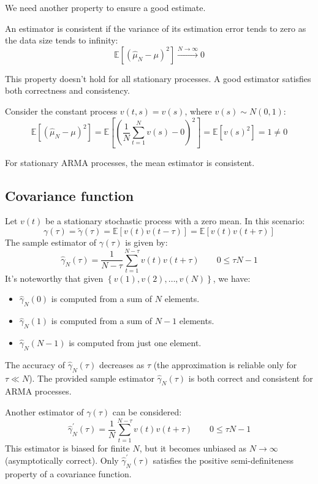 We need another property to ensure a good estimate. 
\begin{definition}
    An estimator is consistent if the variance of its estimation error tends to zero as the data size tends to infinity:
    \[\mathbb{E}\left[\left(\widehat{\mu}_N-\mu\right)^2\right]\overset{N\rightarrow\infty}{\longrightarrow}0\]
\end{definition}
This property doesn't hold for all stationary processes. 
A good estimator satisfies both correctness and consistency.
\begin{example}
    Consider the constant process $v(t,s)=v(s)$, where $v(s) \sim N(0,1)$: 
    \[\mathbb{E}\left[\left(\widehat{\mu}_N-\mu\right)^2\right]=\mathbb{E}\left[\left(\dfrac{1}{N}\sum_{t=1}^{N}v(s)-0\right)^2\right]=\mathbb{E}\left[v(s)^2\right]=1\neq 0\]
\end{example}

For stationary ARMA processes, the mean estimator is consistent.

\subsection{Covariance function}
Let $v(t)$ be a stationary stochastic process with a zero mean. 
In this scenario:
\[\gamma(\tau)=\tilde{\gamma}(\tau)=\mathbb{E}\left[ v(t)v(t-\tau) \right]=\mathbb{E}\left[v(t)v(t+\tau)\right]\]
The sample estimator of $\gamma(\tau)$ is given by: 
\[\widehat{\gamma}_N(\tau)=\dfrac{1}{N-\tau}\sum_{t=1}^{N-\tau}v(t)v(t+\tau) \qquad 0 \leq \tau N-1\]
It's noteworthy that given $\left\{v(1), v(2), \dots, v(N)\right\}$, we have:
\begin{itemize}
    \item $\widehat{\gamma}_N(0)$ is computed from a sum of $N$ elements.
    \item $\widehat{\gamma}_N(1)$ is computed from a sum of $N-1$ elements.
    \item $\widehat{\gamma}_N(N-1)$ is computed from just one element.
\end{itemize}
The accuracy of $\widehat{\gamma}_N(\tau)$ decreases as $\tau$ (the approximation is reliable only for $\tau \ll N$).
The provided sample estimator $\widehat{\gamma}_N(\tau)$ is both correct and consistent for ARMA processes.

Another estimator of $\gamma(\tau)$ can be considered:
\[\widehat{\gamma}_N^{\prime}(\tau)=\dfrac{1}{N}\sum_{t=1}^{N-\tau}v(t)v(t+\tau) \qquad 0 \leq \tau N-1\]
This estimator is biased for finite $N$, but it becomes unbiased as $N\rightarrow\infty$ (asymptotically correct).
Only $\widehat{\gamma}_N^{\prime}(\tau)$ satisfies the positive semi-definiteness property of a covariance function.